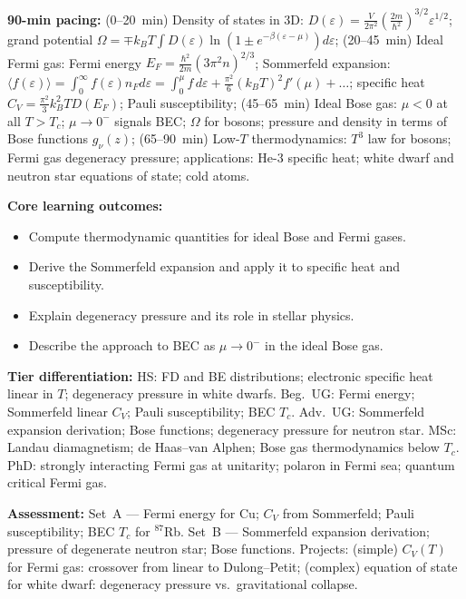 \documentclass[11pt,a4paper]{article}
\begin{document}
\medskip

\begin{tcolorbox}[modulebox, title={Module~II.7 --- Lecture L03: Quantum Ideal Gases}]
\textbf{90-min pacing:} (0--20~min) Density of states in 3D: $D(\varepsilon)=\tfrac{V}{2\pi^2}(\tfrac{2m}{\hbar^2})^{3/2}\varepsilon^{1/2}$; grand potential $\Omega=\mp k_BT\int D(\varepsilon)\ln(1\pm e^{-\beta(\varepsilon-\mu)})d\varepsilon$; (20--45~min) Ideal Fermi gas: Fermi energy $E_F=\tfrac{\hbar^2}{2m}(3\pi^2n)^{2/3}$; Sommerfeld expansion: $\langle f(\varepsilon)\rangle=\int_0^\infty f(\varepsilon)n_F d\varepsilon=\int_0^\mu f\,d\varepsilon+\tfrac{\pi^2}{6}(k_BT)^2f'(\mu)+\ldots$; specific heat $C_V=\tfrac{\pi^2}{3}k_B^2TD(E_F)$; Pauli susceptibility; (45--65~min) Ideal Bose gas: $\mu<0$ at all $T>T_c$; $\mu\to 0^-$ signals BEC; $\Omega$ for bosons; pressure and density in terms of Bose functions $g_\nu(z)$; (65--90~min) Low-$T$ thermodynamics: $T^3$ law for bosons; Fermi gas degeneracy pressure; applications: He-3 specific heat; white dwarf and neutron star equations of state; cold atoms.

\medskip\textbf{Core learning outcomes:}
\begin{itemize}[leftmargin=1.4em,topsep=2pt,itemsep=1pt]
  \item Compute thermodynamic quantities for ideal Bose and Fermi gases.
  \item Derive the Sommerfeld expansion and apply it to specific heat and susceptibility.
  \item Explain degeneracy pressure and its role in stellar physics.
  \item Describe the approach to BEC as $\mu\to 0^-$ in the ideal Bose gas.
\end{itemize}

\medskip\textbf{Tier differentiation:}
HS: FD and BE distributions; electronic specific heat linear in $T$; degeneracy pressure in white dwarfs.
Beg.\ UG: Fermi energy; Sommerfeld linear $C_V$; Pauli susceptibility; BEC $T_c$.
Adv.\ UG: Sommerfeld expansion derivation; Bose functions; degeneracy pressure for neutron star.
MSc: Landau diamagnetism; de Haas--van Alphen; Bose gas thermodynamics below $T_c$.
PhD: strongly interacting Fermi gas at unitarity; polaron in Fermi sea; quantum critical Fermi gas.

\medskip\textbf{Assessment:}
Set~A --- Fermi energy for Cu; $C_V$ from Sommerfeld; Pauli susceptibility; BEC $T_c$ for $^{87}$Rb.
Set~B --- Sommerfeld expansion derivation; pressure of degenerate neutron star; Bose functions.
Projects: (simple) $C_V(T)$ for Fermi gas: crossover from linear to Dulong--Petit;
(complex) equation of state for white dwarf: degeneracy pressure vs.\ gravitational collapse.
\end{tcolorbox}
\end{document}
